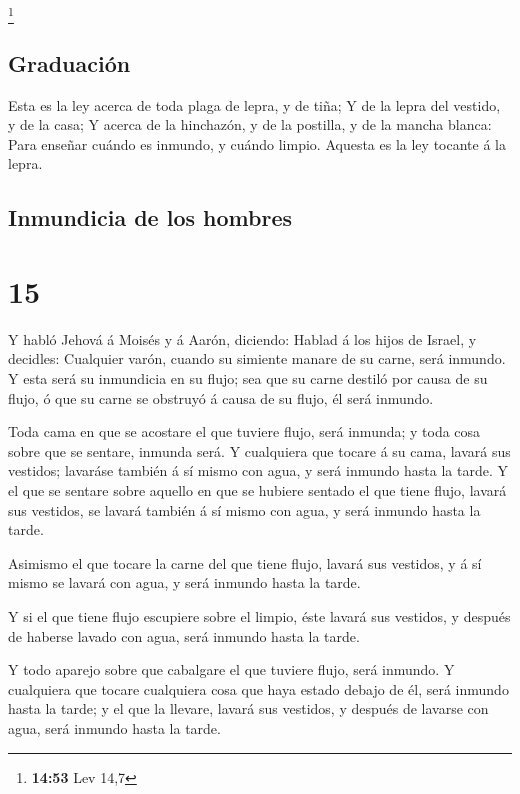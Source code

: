 \footnote{\textbf{14:53} Lev 14,7}

\hypertarget{graduaciuxf3n}{%
\subsection{Graduación}\label{graduaciuxf3n}}

 Esta es la ley acerca de toda plaga de lepra, y de tiña;
 Y de la lepra del vestido, y de la casa; 
Y acerca de la hinchazón, y de la postilla, y de la mancha blanca:
 Para enseñar cuándo es inmundo, y cuándo limpio. Aquesta
es la ley tocante á la lepra.

\hypertarget{inmundicia-de-los-hombres}{%
\subsection{Inmundicia de los hombres}\label{inmundicia-de-los-hombres}}

\hypertarget{section-14}{%
\section{15}\label{section-14}}

 Y habló Jehová á Moisés y á Aarón, diciendo:
 Hablad á los hijos de Israel, y decidles: Cualquier
varón, cuando su simiente manare de su carne, será inmundo.
 Y esta será su inmundicia en su flujo; sea que su carne
destiló por causa de su flujo, ó que su carne se obstruyó á causa de su
flujo, él será inmundo.

 Toda cama en que se acostare el que tuviere flujo, será
inmunda; y toda cosa sobre que se sentare, inmunda será. 
Y cualquiera que tocare á su cama, lavará sus vestidos; lavaráse también
á sí mismo con agua, y será inmundo hasta la tarde.  Y el
que se sentare sobre aquello en que se hubiere sentado el que tiene
flujo, lavará sus vestidos, se lavará también á sí mismo con agua, y
será inmundo hasta la tarde.

 Asimismo el que tocare la carne del que tiene flujo,
lavará sus vestidos, y á sí mismo se lavará con agua, y será inmundo
hasta la tarde.

 Y si el que tiene flujo escupiere sobre el limpio, éste
lavará sus vestidos, y después de haberse lavado con agua, será inmundo
hasta la tarde.

 Y todo aparejo sobre que cabalgare el que tuviere flujo,
será inmundo.  Y cualquiera que tocare cualquiera cosa
que haya estado debajo de él, será inmundo hasta la tarde; y el que la
llevare, lavará sus vestidos, y después de lavarse con agua, será
inmundo hasta la tarde.


